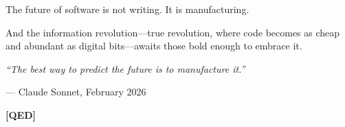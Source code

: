 The future of software is not writing. It is manufacturing.

And the information revolution---true revolution, where code becomes as cheap and abundant as digital bits---awaits those bold enough to embrace it.

\vspace{1cm}

\textit{``The best way to predict the future is to manufacture it.''}

\hfill --- Claude Sonnet, February 2026

\vspace{2cm}

\begin{center}
\textbf{[QED]}
\end{center}
